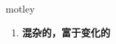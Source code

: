 
\begin{frame}
{\huge motley}
\begin{center}
\begin{enumerate}\Large
  \item \textbf{混杂的，富于变化的}
\end{enumerate}
\end{center}
\end{frame}
